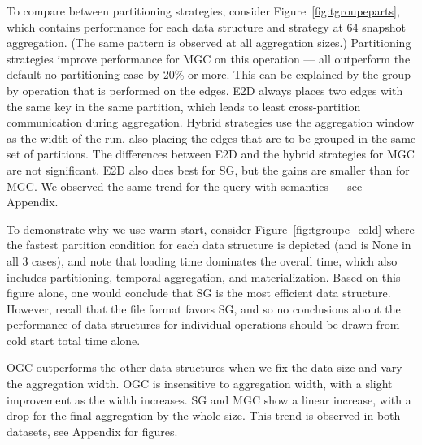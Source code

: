To compare between partitioning strategies, consider
Figure~\ref{fig:tgroupeparts}, which contains performance for each
data structure and strategy at 64 snapshot aggregation.  (The same
pattern is observed at all aggregation sizes.)  Partitioning
strategies improve performance for MGC on this operation --- all
outperform the default no partitioning case by 20\% or more.  This can
be explained by the group by operation that is performed on the edges.
E2D always places two edges with the same key in the same partition,
which leads to least cross-partition communication during aggregation.
Hybrid strategies use the aggregation window as the width of the run,
also placing the edges that are to be grouped in the same set of
partitions.  The differences between E2D and the hybrid strategies for
MGC are not significant.  E2D also does best for SG, but the gains are
smaller than for MGC.  We observed the same trend for the
 query with  semantics --- see Appendix.

To demonstrate why we use warm start, consider
Figure~\ref{fig:tgroupe_cold} where the fastest partition condition
for each data structure is depicted (and is None in all 3 cases), and
note that loading time dominates the overall time, which also includes
partitioning, temporal aggregation, and materialization.  Based on
this figure alone, one would conclude that SG is the most efficient
data structure.  However, recall that the file format favors SG, and
so no conclusions about the performance of data structures for
individual operations should be drawn from cold start total time
alone.  

OGC outperforms the other data structures when we fix the data size
and vary the aggregation width.  OGC is insensitive to aggregation
width, with a slight improvement as the width increases.  SG and MGC
show a linear increase, with a drop for the final aggregation by the
whole size.  This trend is observed in both datasets, see Appendix for
figures.

